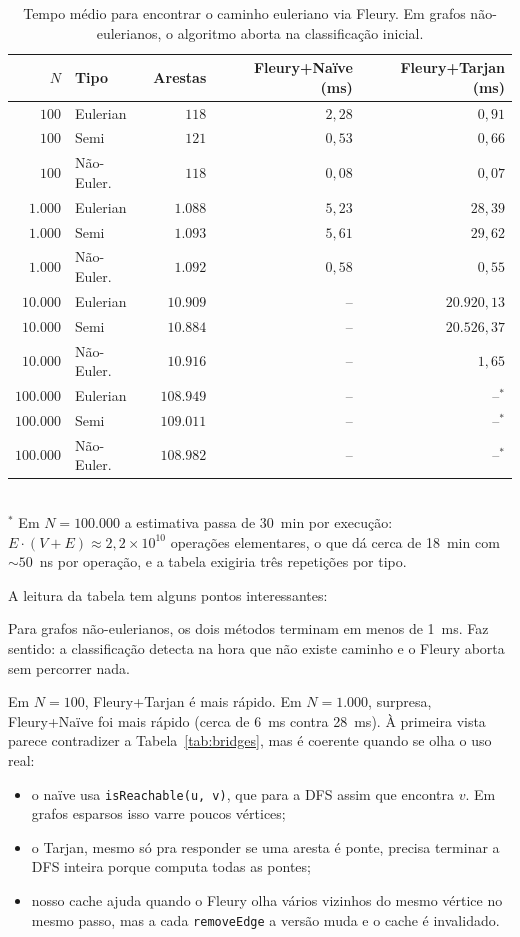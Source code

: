 \documentclass[a4paper,11pt]{article}
\begin{document}
\begin{table}[h]
\centering
\caption{Tempo médio para encontrar o caminho euleriano via Fleury. Em grafos não-eulerianos, o algoritmo aborta na classificação inicial.}
\label{tab:fleury}
\begin{tabular}{rlrrr}
\toprule
$N$ & Tipo & Arestas & Fleury+Naïve (ms) & Fleury+Tarjan (ms) \\
\midrule
$100$       & Eulerian      & $118$    & $2{,}28$  & $0{,}91$ \\
$100$       & Semi          & $121$    & $0{,}53$  & $0{,}66$ \\
$100$       & Não-Euler.    & $118$    & $0{,}08$  & $0{,}07$ \\
\midrule
$1.000$     & Eulerian      & $1.088$  & $5{,}23$  & $28{,}39$ \\
$1.000$     & Semi          & $1.093$  & $5{,}61$  & $29{,}62$ \\
$1.000$     & Não-Euler.    & $1.092$  & $0{,}58$  & $0{,}55$ \\
\midrule
$10.000$    & Eulerian      & $10.909$ & --        & $20.920{,}13$ \\
$10.000$    & Semi          & $10.884$ & --        & $20.526{,}37$ \\
$10.000$    & Não-Euler.    & $10.916$ & --        & $1{,}65$ \\
\midrule
$100.000$   & Eulerian      & $108.949$ & --       & --$^*$ \\
$100.000$   & Semi          & $109.011$ & --       & --$^*$ \\
$100.000$   & Não-Euler.    & $108.982$ & --       & --$^*$ \\
\bottomrule
\end{tabular}\\[0.4em]
{\small $^*$ Em $N=100.000$ a estimativa passa de 30~min por execução: $E\cdot(V+E)\approx 2{,}2\times 10^{10}$ operações elementares, o que dá cerca de 18~min com $\sim 50$~ns por operação, e a tabela exigiria três repetições por tipo.}
\end{table}

A leitura da tabela tem alguns pontos interessantes:

Para grafos não-eulerianos, os dois métodos terminam em menos de 1~ms. Faz sentido: a classificação detecta na hora que não existe caminho e o Fleury aborta sem percorrer nada.

Em $N=100$, Fleury+Tarjan é mais rápido. Em $N=1.000$, surpresa, Fleury+Naïve foi mais rápido (cerca de 6~ms contra 28~ms). À primeira vista parece contradizer a Tabela~\ref{tab:bridges}, mas é coerente quando se olha o uso real:
\begin{itemize}
    \item o naïve usa \texttt{isReachable(u, v)}, que para a DFS assim que encontra $v$. Em grafos esparsos isso varre poucos vértices;
    \item o Tarjan, mesmo só pra responder se uma aresta é ponte, precisa terminar a DFS inteira porque computa todas as pontes;
    \item nosso cache ajuda quando o Fleury olha vários vizinhos do mesmo vértice no mesmo passo, mas a cada \texttt{removeEdge} a versão muda e o cache é invalidado.
\end{itemize}
\end{document}
